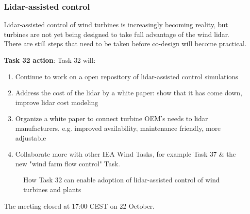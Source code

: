 \subsubsection{Lidar-assisted control}

Lidar-assisted control of wind turbines is increasingly becoming reality, but turbines are not yet being designed to take full advantage of the wind lidar. There are still steps that need to be taken before co-design will become practical.

\textbf{Task 32 action}: Task 32 will:
\begin{enumerate}
\item Continue to work on a open repository of lidar-assisted control simulations
\item Address the cost of the lidar by a white paper: show that it has come down, improve lidar cost modeling
\item Organize a white paper to connect turbine OEM's needs to lidar manufacturers, e.g. improved availability, maintenance friendly, more adjustable
\item Collaborate more with other IEA Wind Tasks, for example Task 37 \& the new "wind farm flow control" Task.
\end{enumerate}

\begin{figure}[p]
    \centering
    \caption{How Task 32 can enable adoption of lidar-assisted control of wind turbines and plants}
    \label{fig:day3-LAC}
\end{figure}

The meeting closed at 17:00 CEST on 22 October.
